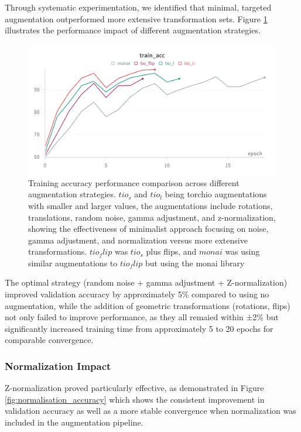 \documentclass[12pt, a4paper]{article}
\begin{document}
Through systematic experimentation, we identified that minimal, targeted augmentation outperformed more extensive transformation sets. Figure \ref{fig:augmentation_comparison} illustrates the performance impact of different augmentation strategies.

\begin{figure}[htbp]
  \centering
  \includegraphics[width=\textwidth]{figures/augs_train_acc.png}
  \caption{Training accuracy performance comparison across different augmentation strategies. $tio_s$ and $tio_l$ being torchio augmentations with smaller and larger values, the augmentations include rotations, translations, random noise, gamma adjustment, and z-normalization, showing the effectiveness of minimalist approach focusing on noise, gamma adjustment, and normalization versus more extensive transformations. $tio_flip$ was $tio_s$ plus flips, and $monai$ was using similar augmentations to $tio_flip$ but using the monai library}
  \label{fig:augmentation_comparison}
\end{figure}

The optimal strategy (random noise + gamma adjustment + Z-normalization) improved validation accuracy by approximately 5\% compared to using no augmentation, while the addition of geometric transformations (rotations, flips) not only failed to improve performance, as they all remaied within ±2\% but significantly increased training time from approximately 5 to 20 epochs for comparable convergence.

\subsubsection{Normalization Impact}

Z-normalization proved particularly effective, as demonstrated in Figure \ref{fig:normalisation_accuracy} which shows the consistent improvement in validation accuracy as well as a more stable convergence when normalization was included in the augmentation pipeline.
\end{document}
